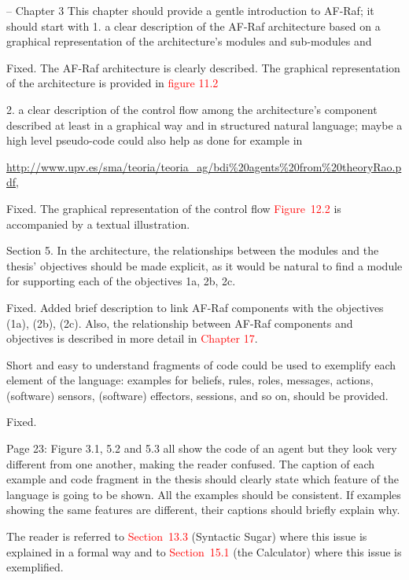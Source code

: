 \documentclass{article}
\newcommand*\R[1]{\textcolor{red}{#1}} %
\newenvironment{them}{\noindent\begingroup\color{blue}}{\endgroup\par}
\begin{document}
\begin{them}

-- Chapter 3
This chapter should provide a gentle introduction to AF-Raf; it should start
with 1. a clear description of the AF-Raf architecture based on a graphical
representation of the architecture's modules and sub-modules and

\end{them}
Fixed. The AF-Raf architecture is clearly described. The graphical
representation of the architecture is provided in \R{figure 11.2}

\begin{them}

2. a clear description of the control flow among the architecture's component
described at least in a graphical way and in structured natural language; maybe
a high level pseudo-code could also help as done for example in

\url{http://www.upv.es/sma/teoria/teoria_ag/bdi\%20agents\%20from\%20theoryRao.pdf},
\end{them}
Fixed. The graphical representation of the control flow \R{Figure~12.2} is
accompanied by a textual illustration.

\begin{them}

Section 5.
In the architecture, the relationships between the modules and the thesis'
objectives should be made explicit, as it would be natural to find a module for
supporting each of the objectives 1a, 2b, 2c.

\end{them}
Fixed. Added brief description to link AF-Raf components with the objectives
(1a), (2b), (2c). Also, the relationship between AF-Raf components and
objectives is described in  more detail in \R{Chapter 17}.

\begin{them}

Short and easy to understand fragments of code could be used to exemplify each
element of the language: examples for beliefs, rules, roles, messages, actions,
(software) sensors, (software) effectors, sessions, and so on, should be
provided.

\end{them}
Fixed. 

\begin{them}

Page 23:
Figure 3.1, 5.2 and 5.3 all show the code of an agent but they look very
different from one another, making the reader confused. The caption of each
example and code fragment in the thesis should clearly state which feature of
the language is going to be shown. All the examples should be consistent. If
examples showing the same features are different, their captions should briefly
explain why.

\end{them}
The reader is referred to \R{Section~13.3} (Syntactic Sugar) where this issue
is explained in a formal way and to \R{Section~15.1} (the Calculator) where
this issue is exemplified.
\end{document}
